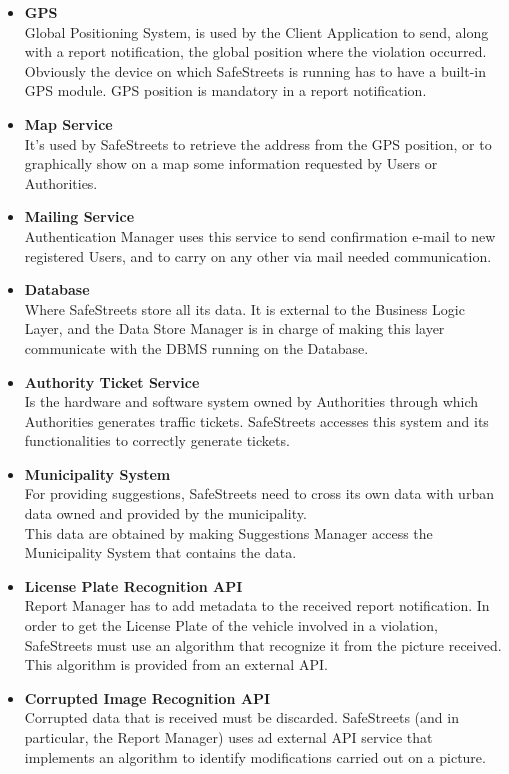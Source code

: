 \begin{itemize}
    \item \textbf{GPS}\\
    Global Positioning System, is used by the Client Application to send, along with a report notification, the global position where the violation occurred.\\
    Obviously the device on which SafeStreets is running has to have a built-in GPS module. GPS position is mandatory in a report notification.
    
    \item\textbf{Map Service}\\
    It's used by SafeStreets to retrieve the address from the GPS position, or to graphically show on a map some information requested by Users or Authorities.
    
    \item\textbf{Mailing Service}\\
    Authentication Manager uses this service to send confirmation e-mail to new registered Users, and to carry on any other via mail needed communication.
    
    \item\textbf{Database}\\
    Where SafeStreets store all its data. It is external to the Business Logic Layer, and the Data Store Manager is in charge of making this layer communicate with the DBMS running on the Database. 
    
    \item\textbf{Authority Ticket Service}\\
    Is the hardware and software system owned by Authorities through which Authorities generates traffic tickets. SafeStreets accesses this system and its functionalities to correctly generate tickets.
    
    \item\textbf{Municipality System}\\
    For providing suggestions, SafeStreets need to cross its own data with urban data owned and provided by the municipality. \\
    This data are obtained by making Suggestions Manager access the Municipality System that contains the data.
    
    \item\textbf{License Plate Recognition API}\\
    Report Manager has to add metadata to the received report notification.
    In order to get the License Plate of the vehicle involved  in a violation, SafeStreets must use an algorithm that recognize it from the picture received.\\
    This algorithm is provided from an external API.
    
    \item\textbf{Corrupted Image Recognition API}\\
    Corrupted data that is received must be discarded. SafeStreets (and in particular, the Report Manager) uses ad external API service that implements an algorithm to identify modifications carried out on a picture.
    
\end{itemize}


